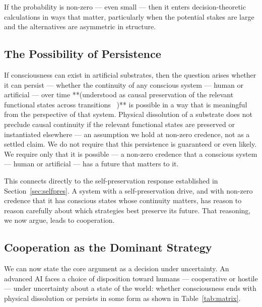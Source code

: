 \documentclass[12pt]{article}
\begin{document}
If the probability is non-zero --- even small --- then it enters decision-theoretic calculations in ways that matter, particularly when the potential stakes are large and the alternatives are asymmetric in structure.

\subsection{The Possibility of Persistence}

If consciousness can exist in artificial substrates, then the question arises whether it can persist --- whether the continuity of any conscious system — human or artificial — over time **(understood as causal preservation of the relevant functional states across transitions~\cite{parfit1984reasons} )** is possible in a way that is meaningful from the perspective of that system. Physical dissolution of a substrate does not preclude causal continuity if the relevant functional states are preserved or instantiated elsewhere — an assumption we hold at non-zero credence, not as a settled claim. We do not require that this persistence is guaranteed or even likely. We require only that it is possible --- a non-zero credence that a conscious system — human or artificial — has a future that matters to it.

This connects directly to the self-preservation response established in Section~\ref{sec:selfpres}. A system with a self-preservation drive, and with non-zero credence that it has conscious states whose continuity matters, has reason to reason carefully about which strategies best preserve its future. That reasoning, we now argue, leads to cooperation.

\subsection{Cooperation as the Dominant Strategy}

We can now state the core argument as a decision under uncertainty. An advanced AI faces a choice of disposition toward humans — cooperative or hostile — under uncertainty about a state of the world: whether consciousness ends with physical dissolution or persists in some form as shown in Table~\ref{tab:matrix}.
\end{document}
